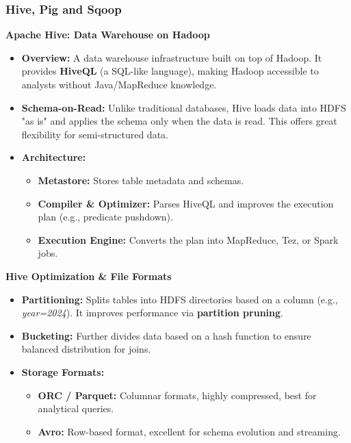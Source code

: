 \subsubsection{Hive, Pig and Sqoop}


\textbf{Apache Hive: Data Warehouse on Hadoop}
\begin{itemize}
    \item \textbf{Overview:} A data warehouse infrastructure built on top of Hadoop. It provides \textbf{HiveQL} (a SQL-like language), making Hadoop accessible to analysts without Java/MapReduce knowledge.
    \item \textbf{Schema-on-Read:} Unlike traditional databases, Hive loads data into HDFS "as is" and applies the schema only when the data is read. This offers great flexibility for semi-structured data.
    
    
    
    \item \textbf{Architecture:}
    \begin{itemize}
        \item \textbf{Metastore:} Stores table metadata and schemas.
        \item \textbf{Compiler \& Optimizer:} Parses HiveQL and improves the execution plan (e.g., predicate pushdown).
        \item \textbf{Execution Engine:} Converts the plan into MapReduce, Tez, or Spark jobs.
    \end{itemize}
\end{itemize}

\textbf{Hive Optimization \& File Formats}
\begin{itemize}
    \item \textbf{Partitioning:} Splits tables into HDFS directories based on a column (e.g., \textit{year=2024}). It improves performance via \textbf{partition pruning}.
    \item \textbf{Bucketing:} Further divides data based on a hash function to ensure balanced distribution for joins.
    
    
    
    \item \textbf{Storage Formats:}
    \begin{itemize}
        \item \textbf{ORC / Parquet:} Columnar formats, highly compressed, best for analytical queries.
        \item \textbf{Avro:} Row-based format, excellent for schema evolution and streaming.
    \end{itemize}
\end{itemize}

